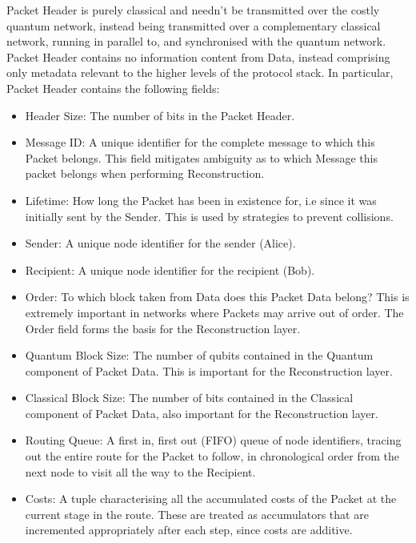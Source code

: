 \documentclass[aps,rmp,twocolumn,amsmath,amssymb,nofootinbib,superscriptaddress]{revtex4}
\begin{document}
{\sc Packet Header} is purely classical and needn't be transmitted over the costly quantum network, instead being transmitted over a complementary classical network, running in parallel to, and synchronised with the quantum network. {\sc Packet Header} contains no information content from {\sc Data}, instead comprising only metadata relevant to the higher levels of the protocol stack. In particular, {\sc Packet Header} contains the following fields:
\begin{itemize}
    \item {\sc Header Size}: The number of bits in the {\sc Packet Header}.
    \item {\sc Message ID}: A unique identifier for the complete message to which this {\sc Packet} belongs. This field mitigates ambiguity as to which {\sc Message} this packet belongs when performing {\sc Reconstruction}.
    \item {\sc Lifetime}: How long the {\sc Packet} has been in existence for, i.e since it was initially sent by the {\sc Sender}. This is used by strategies to prevent collisions.
    \item {\sc Sender}: A unique node identifier for the sender (Alice).
    \item {\sc Recipient}: A unique node identifier for the recipient (Bob).
    \item {\sc Order}: To which block taken from {\sc Data} does this {\sc Packet Data} belong? This is extremely important in networks where {\sc Packets} may arrive out of order. The {\sc Order} field forms the basis for the {\sc Reconstruction} layer.
    \item {\sc Quantum Block Size}: The number of qubits contained in the {\sc Quantum} component of {\sc Packet Data}. This is important for the {\sc Reconstruction} layer.
    \item {\sc Classical Block Size}: The number of bits contained in the {\sc Classical} component of {\sc Packet Data}, also important for the {\sc Reconstruction} layer.
    \item {\sc Routing Queue}: A first in, first out (FIFO) queue of node identifiers, tracing out the entire route for the {\sc Packet} to follow, in chronological order from the next node to visit all the way to the {\sc Recipient}.
    \item {\sc Costs}: A tuple characterising all the accumulated costs of the {\sc Packet} at the current stage in the route. These are treated as accumulators that are incremented appropriately after each step, since costs are additive.

\end{itemize}
\end{document}
